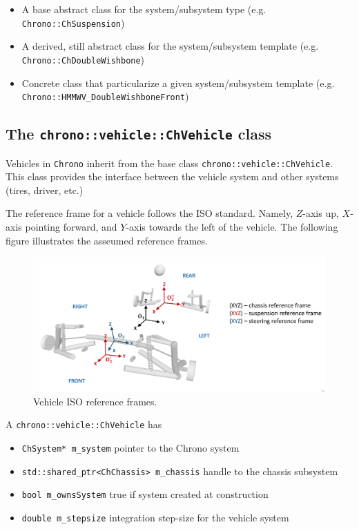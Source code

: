 \begin{itemize}
\item A base abstract class for the system/subsystem type (e.g. \lstinline{Chrono::ChSuspension})
\item A derived, still abstract class for the system/subsystem template (e.g.  \lstinline{Chrono::ChDoubleWishbone})
\item Concrete class that particularize a given system/subsystem template (e.g. \lstinline{Chrono::HMMWV_DoubleWishboneFront})
\end{itemize}

\subsection{The \lstinline{chrono::vehicle::ChVehicle} class}

Vehicles in \lstinline{Chrono} inherit from the base class \lstinline{chrono::vehicle::ChVehicle}. 
This class provides the interface between the vehicle system and other systems (tires, driver, etc.)

The reference frame for a vehicle follows the ISO standard. 
Namely, $Z$-axis up, $X$-axis pointing forward, and $Y$-axis towards the left of the vehicle. The following figure illustrates
the asseumed reference frames.


\begin{figure}[!htb]
\begin{center}
\includegraphics[scale=0.290]{img/vehicle_iso_ref_frame.jpeg}
\end{center}
\caption{Vehicle ISO reference frames.}
\label{vehicle_iso_ref_frame}
\end{figure}

A \lstinline{chrono::vehicle::ChVehicle} has

\begin{itemize}
\item \lstinline{ChSystem* m_system} pointer to the Chrono system
\item \lstinline{std::shared_ptr<ChChassis> m_chassis} handle to the chassis subsystem
\item \lstinline{bool m_ownsSystem} true if system created at construction
\item \lstinline{double m_stepsize}  integration step-size for the vehicle system
\end{itemize}

